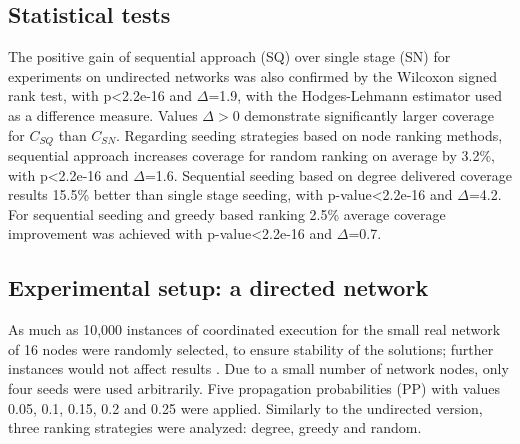 \documentclass[11pt]{article} %
\begin{document}
\subsection*{Statistical tests}
The positive gain of sequential approach (SQ) over single stage (SN) for experiments on undirected networks was also confirmed by the Wilcoxon signed rank test, with p\textless2.2e-16 and $\Delta$=1.9, with the Hodges-Lehmann estimator used as a difference measure. Values $\Delta>0$ demonstrate significantly larger coverage for $C_{SQ}$ than $C_{SN}$. Regarding seeding strategies based on node ranking methods, sequential approach increases coverage for random ranking on average by 3.2\%, with p\textless2.2e-16 and $\Delta$=1.6. Sequential seeding based on degree delivered coverage results 15.5\% better than single stage seeding, with p-value\textless2.2e-16 and $\Delta$=4.2. For sequential seeding and greedy based ranking 2.5\% average coverage improvement was achieved with p-value\textless2.2e-16 and $\Delta$=0.7.

\subsection*{Experimental setup: a directed network}

As much as 10,000 instances of coordinated execution for the small real network of 16 nodes were randomly selected, to ensure stability of the solutions; further instances would not affect results \cite{Kempe:2003}. Due to a small number of network nodes, only four seeds were used arbitrarily. Five propagation probabilities (PP) with values 0.05, 0.1, 0.15, 0.2 and 0.25 were applied. Similarly to the undirected version, three ranking strategies were analyzed: degree, greedy and random. 
\end{document}
